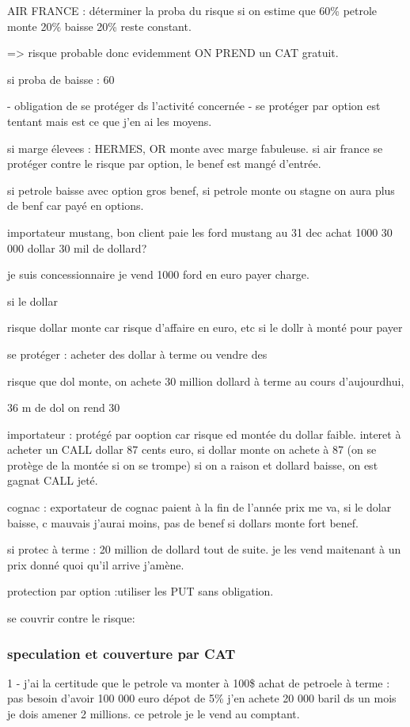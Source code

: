 \documentclass[a4paper,12pt]{article}
\begin{document}
AIR FRANCE : 
déterminer la proba du risque 
si on estime que 60\% petrole monte  20\% baisse  20\% reste constant.

=> risque probable donc evidemment ON PREND un CAT gratuit.

si proba de baisse : 60%

- obligation de se protéger ds l'activité concernée
- se protéger par option est tentant mais est ce que j'en ai les moyens.

si marge élevees : HERMES, OR monte avec marge fabuleuse.
si air france se protéger contre le risque par option, le benef est mangé d'entrée.


si petrole baisse avec option gros benef, si petrole monte ou stagne on aura plus de benf car payé en options.


importateur mustang, bon client paie les ford mustang au 31 dec achat 1000 30 000 dollar 30 mil de dollard?

je suis concessionnaire je vend 1000 ford en euro payer charge.

si le dollar

risque dollar monte car risque d'affaire en euro, etc si le dollr à monté pour payer

se protéger : acheter des dollar à terme ou vendre des 

risque que dol monte, on achete 30 million dollard à terme au cours d'aujourdhui,

36 m de dol on rend 30


importateur : protégé par ooption car risque ed montée du dollar faible.
interet à acheter un CALL dollar  87 cents euro, si dollar monte on achete à 87 (on se protège de la montée si on se trompe)
si on a raison et dollard baisse, on est gagnat CALL jeté.


cognac : exportateur de cognac paient à la fin de l'année
prix me va, si le dolar baisse, c mauvais j'aurai moins, pas de benef
si dollars monte fort benef.

si protec à terme : 20 million de dollard tout de suite.
je les vend maitenant à un prix donné quoi qu'il arrive j'amène.


protection par option :utiliser les PUT sans obligation.

se couvrir contre le risque:

\subsubsection{speculation et couverture par CAT}
1 - 
j'ai la certitude que le petrole va monter à 100\$
achat de petroele à terme : pas besoin d'avoir 100 000 euro  dépot de 5\% j'en achete 20 000 baril
ds un mois je dois amener 2 millions. ce petrole je le vend au comptant.
\end{document}

